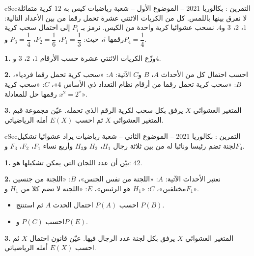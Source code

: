 \documentclass[12pt,a4paper]{article}
\newenvironment{BOX}[2]{\begin{otherlanguage}{english}\begin{arbox}{#1}{#2}}{\end{arbox}\end{otherlanguage}}
\newcounter{exo}
\newenvironment{tamrin}[1]{\stepcounter{exo}\begin{BOX}{cSec}{التمرين \theexo: #1}}{\end{BOX}}
\newenvironment{sq}{\begin{itemize}[leftmargin=2.4em,itemsep=3pt]}{\end{itemize}}
\newcommand{\qa}{\item[(أ)]}\newcommand{\qb}{\item[(ب)]}\newcommand{\qc}{\item[(جـ)]}\newcommand{\qd}{\item[(د)]}\newcommand{\qe}{\item[(هـ)]}
\newcommand{\QQ}[1]{\par\smallskip\textbf{#1.} }
\begin{document}
\begin{tamrin}{بكالوريا 2021 -- الموضوع الأول -- شعبة رياضيات}
كيس به $12$ كرية متماثلة لا نفرق بينها باللمس.
كل من الكريات الاثنتي عشرة تحمل رقما من بين الأعداد التالية: $1$، $2$، $3$ و$4$.
نسحب عشوائيا كرية واحدة من الكيس.
نرمز بـ $P_i$ إلى احتمال سحب كرية رقمها $i$، حيث: $P_1=\dfrac13$، $P_2=\dfrac16$، $P_3=\dfrac14$ و$P_4=\dfrac14$.

\QQ{1} وزّع الكريات الاثنتي عشرة حسب الأرقام $1$، $2$، $3$ و$4$.
\QQ{2} احسب احتمال كل من الأحداث $A$، $B$ و$C$ الآتية:
$A$: «سحب كرية تحمل رقما فرديا»، $B$: «سحب كرية تحمل رقما من أرقام نظام التعداد ذي الأساس $4$»، $C$: «سحب كرية رقمها حل للمعادلة $x^2=2^x$».
\QQ{3} المتغير العشوائي $X$ يرفق بكل سحب لكرية الرقم الذي تحمله.
عيّن مجموعة قيم المتغير العشوائي $X$ ثم احسب $E(X)$ أمله الرياضياتي.
\end{tamrin}

\begin{tamrin}{بكالوريا 2021 -- الموضوع الثاني -- شعبة رياضيات}
يراد عشوائيا تشكيل لجنة تضم رئيسا ونائبا له من بين ثلاثة رجال $H_1$، $H_2$ و$H_3$ وأربع نساء $F_1$، $F_2$، $F_3$ و$F_4$.

\QQ{1} بيّن أن عدد اللجان التي يمكن تشكيلها هو: $42$.
\QQ{2} نعتبر الأحداث الآتية:
$A$: «اللجنة من نفس الجنس»، $B$: «اللجنة من جنسين مختلفين»، $C$: «$H_1$ هو الرئيس»، $E$: «اللجنة لا تضم كلا من $H_1$ و$F_1$».
\begin{sq}
\qa احسب $P(A)$ احتمال الحدث $A$ ثم استنتج $P(B)$.
\qb احسب $P(C)$ و$P(E)$.
\end{sq}
\QQ{3} المتغير العشوائي $X$ يرفق بكل لجنة عدد الرجال فيها.
عيّن قانون احتمال $X$ ثم احسب $E(X)$ أمله الرياضياتي.
\end{tamrin}
\end{document}
